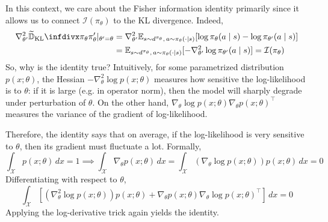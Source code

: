 \documentclass[11pt, letterpaper]{article}
\begin{document}
\begin{remark}
    In this context, we care about the Fisher information identity primarily since it allows us to connect \(\mathcal{I}(\pi_\theta)\) to the KL divergence. Indeed, 
    \begin{align*}
        \nabla_{\theta'}^2 \TKL{\pi_\theta}{\pi_\theta'} \rvert_{\theta' = \theta}
        &= \nabla_{\theta'}^2 \mathbb{E}_{s \sim d^{\pi_\theta},\, a \sim \pi_\theta(\cdot \mid s)}[\log \pi_\theta(a \mid s) - \log \pi_{\theta'}(a \mid s)] \\
        &= \mathbb{E}_{s \sim d^{\pi_\theta},\, a \sim \pi_\theta(\cdot \mid s)}[-\nabla_{\theta'}^2 \log \pi_{\theta'}(a \mid s)]
        = \mathcal{I}(\pi_\theta)
    \end{align*}
    So, why is the identity true? Intuitively, for some parametrized distribution \(p(x; \theta)\), the Hessian \(-\nabla_\theta^2 \log p(x; \theta)\) measures how sensitive the log-likelihood is to \(\theta\): if it is large (e.g. in operator norm), then the model will sharply degrade under perturbation of \(\theta\). On the other hand, \(\nabla_\theta \log p(x; \theta) \nabla_\theta p(x; \theta)^\top\) measures the variance of the gradient of log-likelihood. 

    Therefore, the identity says that on average, if the log-likelihood is very sensitive to \(\theta\), then its gradient must fluctuate a lot. Formally,
    \[
        \int_{\mathcal{X}} p(x; \theta) \,dx = 1
        \implies 
        \int_{\mathcal{X}} \nabla_\theta p(x; \theta) \,dx
        = \int_{\mathcal{X}} (\nabla_\theta \log p(x; \theta)) p(x; \theta) \,dx 
        = 0
    \]
    Differentiating with respect to \(\theta\), 
    \[
        \int_{\mathcal{X}} [(\nabla_\theta^2 \log p(x; \theta)) p(x; \theta) + \nabla_\theta p(x; \theta) \nabla_\theta \log p(x; \theta)^\top] \,dx
        = 0
    \]
    Applying the log-derivative trick again yields the identity. 
\end{remark}
\end{document}

